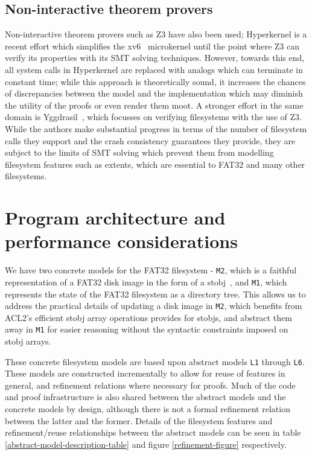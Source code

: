 \documentclass[submission,copyright,creativecommons]{eptcs}
\begin{document}
\subsection{Non-interactive theorem provers}
Non-interactive theorem provers such as Z3 \cite{de2008z3}
have also been used; Hyperkernel
\cite{Nelson:2017:HPV:3132747.3132748} is a recent effort which
simplifies the xv6~\cite{cox6xv6} microkernel until the
point where Z3 can verify its properties with its SMT solving
techniques. However, towards this end, all system calls in Hyperkernel
are replaced with analogs which can terminate in constant time; while
this approach is theoretically sound, it increases the chances of
discrepancies between the model and
the implementation which may diminish the utility of the proofs or
even render them moot. A stronger effort in the same domain is
Yggdrasil~\cite{sigurbjarnarson2016push}, which focusses on verifying
filesystems with the use of Z3. While the authors make substantial
progress in terms of the number of filesystem calls they support and
the crash consistency guarantees they provide, they are subject to
the limits of SMT solving which prevent them from modelling filesystem
features such as extents, which are essential to FAT32 and many other
filesystems.

\section{Program architecture and performance considerations}

We have two concrete models for the FAT32 filesystem - \texttt{M2},
which is a faithful representation of a FAT32 disk image in the form
of a stobj~\cite{boyer2002single}, and \texttt{M1}, which represents the
state of the FAT32 filesystem as a directory tree. This allows us to
address the practical details of updating a disk image in \texttt{M2},
which benefits from ACL2's efficient stobj array operations provides
for stobjs, and abstract them away in \texttt{M1} for easier reasoning
without the syntactic constraints imposed on stobj arrays.

These concrete filesystem models are based upon abstract models
\texttt{L1} through \texttt{L6}. These models are constructed
incrementally to allow for reuse of features in general, and
refinement relations where necessary for proofs. Much of the code and
proof infrastructure is also shared between the abstract models and
the concrete models by design, although there is not a formal
refinement relation between the latter and the former. Details of the
filesystem features and refinement/reuse relationships between the
abstract models can be seen in table
\ref{abstract-model-description-table} and figure
\ref{refinement-figure} respectively.
\end{document}
